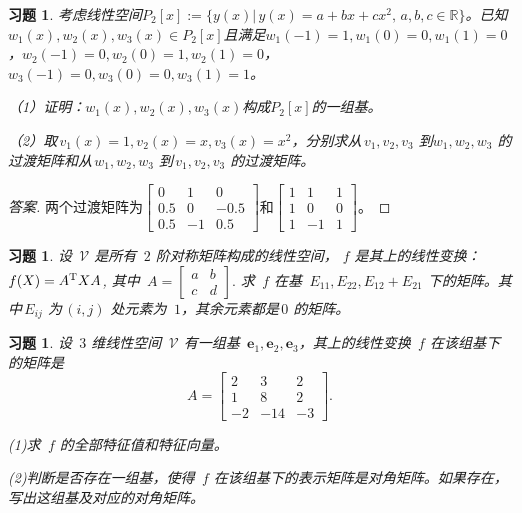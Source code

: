 \documentclass[UTF8]{ctexart}
\newtheorem{ex}[thm]{习题}
\begin{document}
\begin{ex}
	考虑线性空间$P_2[x]:=\{y(x)|\, y(x)=a+bx+cx^2,\,a,b,c\in \mathbb{R}\}$。已知$w_1(x), w_2(x), w_3(x)\in P_2[x]$且满足$w_1(-1)=1, w_1(0)=0, w_1(1)=0$，$w_2(-1)=0, w_2(0)=1, w_2(1)=0$，$w_3(-1)=0, w_3(0)=0, w_3(1)=1$。
	
	（1）证明：$w_1(x), w_2(x), w_3(x)$构成$P_2[x]$的一组基。
	
	（2）取$\,v_1(x)=1, v_2(x)=x, v_3(x)=x^2$，分别求从$\,v_1,v_2,v_3$ 到$w_1, w_2, w_3$ 的过渡矩阵和从$\,w_1, w_2, w_3$ 到$\,v_1,v_2,v_3$ 的过渡矩阵。
\end{ex}
\begin{proof}[答案]
	两个过渡矩阵为$\left[\begin{array}{rrr} 0& 1 &0 \\ 0.5& 0 & -0.5\\ 0.5& -1 &0.5 \end{array}\right]$和$\left[\begin{array}{rrr} 1& 1 &1 \\ 1& 0 & 0\\ 1& -1 &1 \end{array}\right]$。
\end{proof}


\begin{ex}
	设 $\,\mathcal{V}$ 是所有 $\,2$ 阶对称矩阵构成的线性空间， $f$ 是其上的线性变换：$f(X) = A^{\rm T}XA$, 其中 $\,A = \left[\begin{array}{cc} a & b\\ c& d\end{array}\right].$ 
	求 $\,f$ 在基 $\,E_{11}, E_{22}, E_{12} + E_{21}$ 下的矩阵。其中$\,E_{ij}$ 为$\,(i,j)$ 处元素为 $\,1$，其余元素都是$\,0$ 的矩阵。
\end{ex}




\begin{ex}
	设 $\,3$ 维线性空间 $\,\mathcal{V}$ 有一组基 $\,\boldsymbol{e}_1,  \boldsymbol{e}_2, \boldsymbol{e}_3$，其上的线性变换 $\,f$ 在该组基下的矩阵是
	\[
	A = \left[\begin{array}{ccc} 2 & 3 & 2\\ 1& 8 & 2 \\ -2 & -14 & -3\end{array}\right].
	\]
	
	(1)求 $\,f$ 的全部特征值和特征向量。
	
	(2)判断是否存在一组基，使得 $\,f$ 在该组基下的表示矩阵是对角矩阵。如果存在，写出这组基及对应的对角矩阵。
\end{ex} 
\end{document}
